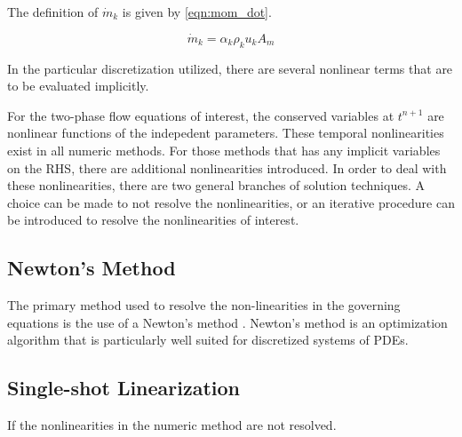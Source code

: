 The definition of $\dot{m}_k$ is given by \eqref{eqn:mom_dot}.

\begin{equation}
\label{eqn:mom_dot}
\dot{m}_k = \alpha_k \rho_k u_k A_m
\end{equation}

In the particular discretization utilized, there are several nonlinear terms that are to be evaluated implicitly.

For the two-phase flow equations of interest, the conserved variables at $t^{n+1}$ are nonlinear functions of the indepedent parameters.
These temporal nonlinearities exist in all numeric methods.
For those methods that has any implicit variables on the RHS, there are additional nonlinearities introduced.
In order to deal with these nonlinearities, there are two general branches of solution techniques.
A choice can be made to not resolve the nonlinearities, or an iterative procedure can be introduced to resolve the nonlinearities of interest.

\subsection{Newton's Method}
\label{subsect:newtons_method}
The primary method used to resolve the non-linearities in the governing equations is the use of a Newton's method \cite{Deuflhard2004}.
Newton's method is an optimization algorithm that is particularly well suited for discretized systems of PDEs.

\subsection{Single-shot Linearization}
\label{subsect:single_shot}
If the nonlinearities in the numeric method are not resolved.
